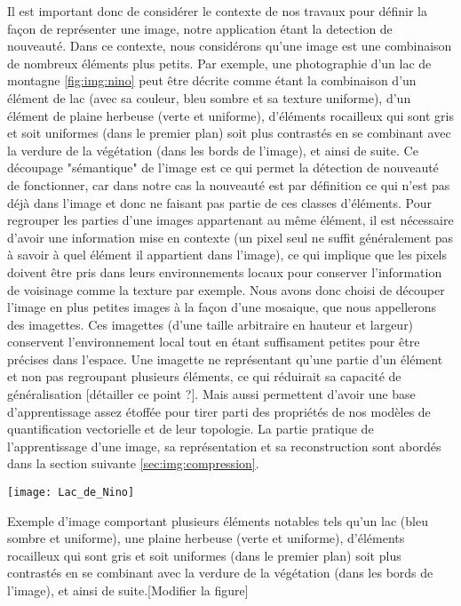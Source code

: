 	Il est important donc de considérer le contexte de nos travaux pour définir la façon de représenter une image, notre application étant la detection de nouveauté. Dans ce contexte, nous considérons qu'une image est une combinaison de nombreux éléments plus petits. Par exemple, une photographie d'un lac de montagne \ref{fig:img:nino} peut être décrite comme étant la combinaison d'un élément de lac (avec sa couleur, bleu sombre et sa texture uniforme), d'un élément de plaine herbeuse (verte et uniforme), d'éléments rocailleux qui sont gris et soit uniformes (dans le premier plan) soit plus contrastés en se combinant avec la verdure de la végétation (dans les bords de l'image), et ainsi de suite. Ce découpage "sémantique" de l'image est ce qui permet la détection de nouveauté  de fonctionner, car dans notre cas la nouveauté est par définition ce qui n'est pas déjà dans l'image et donc ne faisant pas partie de ces classes d'éléments. Pour regrouper les parties d'une images appartenant au même élément, il est nécessaire d'avoir une information mise en contexte (un pixel seul ne suffit généralement pas à savoir à quel élément il appartient dans l'image), ce qui implique que les pixels doivent être pris dans leurs environnements locaux pour conserver l'information de voisinage comme la texture par exemple. Nous avons donc choisi de découper l'image en plus petites images à la façon d'une mosaique, que nous appellerons des imagettes. Ces imagettes (d'une taille arbitraire en hauteur et largeur) conservent l'environnement local tout en étant suffisament petites pour être précises dans l'espace. Une imagette ne représentant qu'une partie d'un élément et non pas regroupant plusieurs éléments, ce qui réduirait sa capacité de généralisation [détailler ce point ?]. Mais aussi permettent d'avoir une base d'apprentissage assez étoffée pour tirer parti des propriétés de nos modèles de quantification vectorielle et de leur topologie. La partie pratique de l'apprentissage d'une image, sa représentation et sa reconstruction sont abordés dans la section suivante \ref{sec:img:compression}.


	\begin{figureth}
		\texttt{[image: Lac\_de\_Nino]}
		\caption[Lac de Nino]{Exemple d'image comportant plusieurs éléments notables tels qu'un lac (bleu sombre et uniforme), une plaine herbeuse (verte et uniforme), d'éléments rocailleux qui sont gris et soit uniformes (dans le premier plan) soit plus contrastés en se combinant avec la verdure de la végétation (dans les bords de l'image), et ainsi de suite.[Modifier la figure]}\label{fig:img:nino}
	\end{figureth}

